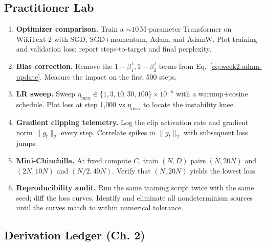 \subsection{Practitioner Lab}

\begin{enumerate}
  \item \textbf{Optimizer comparison.} Train a $\sim\!10$\,M-parameter
        Transformer on WikiText-2 with SGD, SGD+momentum, Adam, and
        AdamW. Plot training and validation loss; report steps-to-target
        and final perplexity.
  \item \textbf{Bias correction.} Remove the
        $1-\beta_1^{\,t}, 1-\beta_2^{\,t}$ terms from
        Eq.~\eqref{eq:week2-adam-update}. Measure the impact on the first
        500 steps.
  \item \textbf{LR sweep.} Sweep $\eta_{\max} \in \{1, 3, 10, 30, 100\}
        \times 10^{-5}$ with a warmup+cosine schedule. Plot loss at step
        1{,}000 vs $\eta_{\max}$ to locate the instability knee.
  \item \textbf{Gradient clipping telemetry.} Log the clip activation
        rate and gradient norm $\|g_t\|_2$ every step. Correlate spikes
        in $\|g_t\|_2$ with subsequent loss jumps.
  \item \textbf{Mini-Chinchilla.} At fixed compute $C$, train
        $(N, D)$ pairs $(N, 20 N)$ and $(2N, 10 N)$ and $(N/2, 40 N)$.
        Verify that $(N, 20 N)$ yields the lowest loss.
  \item \textbf{Reproducibility audit.} Run the same training script
        twice with the same seed; diff the loss curves. Identify and
        eliminate all nondeterminism sources until the curves match to
        within numerical tolerance.
\end{enumerate}

\subsection*{Derivation Ledger (Ch. 2)}

